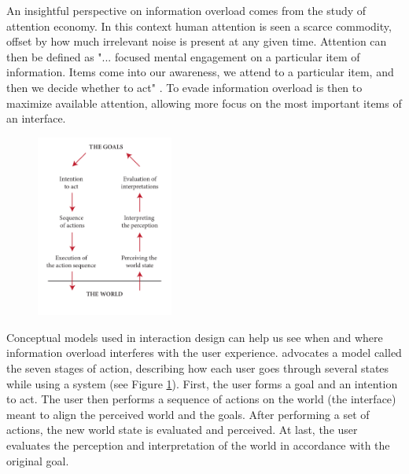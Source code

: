 An insightful perspective on information overload comes from the study of attention economy. 
In this context human attention is seen a scarce commodity, offset by how much irrelevant noise is present at any given time. 
Attention can then be defined as "... focused mental engagement on a particular item of information. 
Items come into our awareness, we attend to a particular item, and then we decide whether to act" 
\citep{Davenport2001}. 
To evade information overload is then to maximize available attention, allowing more focus on the most important items of an interface.

\begin{figure}
  \vspace{-20pt}
  \begin{center}
    \includegraphics[width=0.4\textwidth]{../graphics/seven-stages.pdf}
    \vspace{-20pt}
    \caption[The Seven Stages of Action]{}  
  \end{center}
  \label{fig:seven-stages}
  \vspace{-30pt}
\end{figure}

Conceptual models used in interaction design can help us see when and where information overload interferes with the user experience. 
\cite{Norman1988} advocates a model called the seven stages of action, describing how each user goes through several states while using a system
(see Figure \ref{fig:seven-stages}). 
First, the user forms a goal and an intention to act. The user then performs a sequence of actions on the world (the interface)
 meant to align the perceived world and the goals. After performing a set of actions, the new world state is evaluated and perceived. 
At last, the user evaluates the perception and interpretation of the world in accordance with the original goal.


